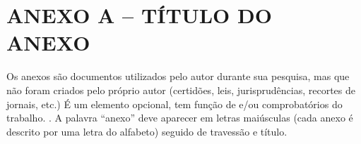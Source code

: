 \section*{ANEXO A – TÍTULO DO ANEXO}
Os anexos são documentos utilizados pelo autor durante sua pesquisa, mas que não foram criados pelo próprio autor (certidões, leis, jurisprudências, recortes de jornais, etc.) É um elemento opcional, tem função de e/ou comprobatórios do trabalho. \cite{abnt6024}. A palavra “anexo” deve aparecer em letras maiúsculas (cada anexo é descrito por uma letra do alfabeto) seguido de travessão e título.


